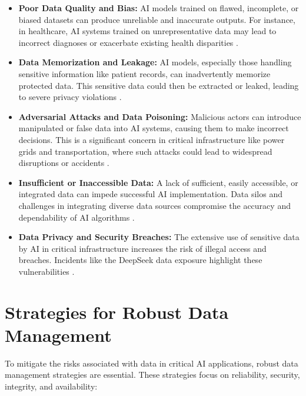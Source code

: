 \begin{itemize}
    \item \textbf{Poor Data Quality and Bias:} AI models trained on flawed, incomplete, or biased datasets can produce unreliable and inaccurate outputs. For instance, in healthcare, AI systems trained on unrepresentative data may lead to incorrect diagnoses or exacerbate existing health disparities \parencite{Forbes2021}.
    \item \textbf{Data Memorization and Leakage:} AI models, especially those handling sensitive information like patient records, can inadvertently memorize protected data. This sensitive data could then be extracted or leaked, leading to severe privacy violations \parencite{Manjaray2024}.
    \item \textbf{Adversarial Attacks and Data Poisoning:} Malicious actors can introduce manipulated or false data into AI systems, causing them to make incorrect decisions. This is a significant concern in critical infrastructure like power grids and transportation, where such attacks could lead to widespread disruptions or accidents \parencite{Carlini2023}.
    \item \textbf{Insufficient or Inaccessible Data:} A lack of sufficient, easily accessible, or integrated data can impede successful AI implementation. Data silos and challenges in integrating diverse data sources compromise the accuracy and dependability of AI algorithms \parencite{NetApp2023}.
    \item \textbf{Data Privacy and Security Breaches:} The extensive use of sensitive data by AI in critical infrastructure increases the risk of illegal access and breaches. Incidents like the DeepSeek data exposure highlight these vulnerabilities \parencite{Manjaray2024}.
\end{itemize}

\section{Strategies for Robust Data Management}
\label{sec:data_management_strategies}
To mitigate the risks associated with data in critical AI applications, robust data management strategies are essential. These strategies focus on reliability, security, integrity, and availability:

